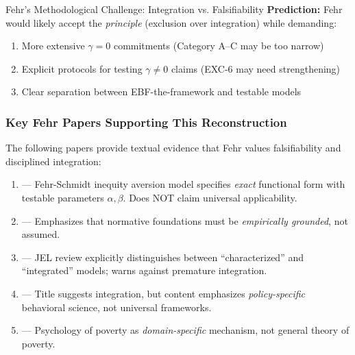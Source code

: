 \begin{chapter}{Fehr's Methodological Challenge: Integration vs. Falsifiability}
\textbf{Prediction:} Fehr would likely accept the \textit{principle} (exclusion over integration) while demanding:
\begin{enumerate}[noitemsep]
    \item More extensive $\gamma = 0$ commitments (Category A--C may be too narrow)
    \item Explicit protocols for testing $\gamma \neq 0$ claims (EXC-6 may need strengthening)
    \item Clear separation between EBF-the-framework and testable models
\end{enumerate}

\subsubsection{Key Fehr Papers Supporting This Reconstruction}

The following papers provide textual evidence that Fehr values falsifiability and disciplined integration:

\begin{tcolorbox}[colback=blue!5!white,colframe=blue!75!black,title=\textbf{Primary Sources for Fehr's Methodological Position}]
\begin{enumerate}[noitemsep]
    \item \textbf{\citet{PAP-fehr1999theory}} --- Fehr-Schmidt inequity aversion model specifies \textit{exact} functional form with testable parameters $\alpha, \beta$. Does NOT claim universal applicability.

    \item \textbf{\citet{PAP-fehr2022normative}} --- Emphasizes that normative foundations must be \textit{empirically grounded}, not assumed.

    \item \textbf{\citet{fehr2024social}} --- JEL review explicitly distinguishes between ``characterized'' and ``integrated'' models; warns against premature integration.

    \item \textbf{\citet{fehr2015integrated}} --- Title suggests integration, but content emphasizes \textit{policy-specific} behavioral science, not universal frameworks.

    \item \textbf{\citet{haushofer2014psychology}} --- Psychology of poverty as \textit{domain-specific} mechanism, not general theory of poverty.
\end{enumerate}
\end{tcolorbox}


\end{chapter}
